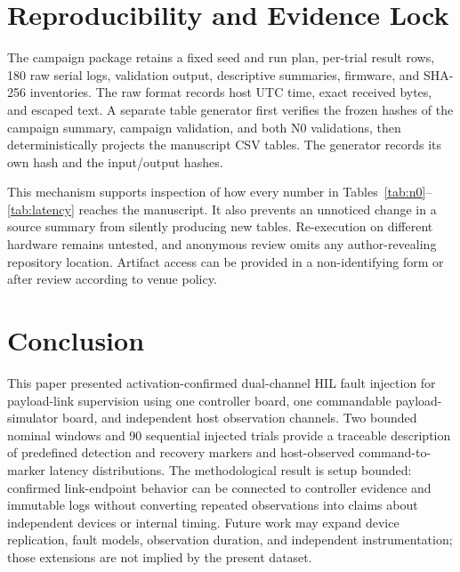 \documentclass[conference]{IEEEtran}
\begin{document}
\section{Reproducibility and Evidence Lock}

The campaign package retains a fixed seed and run plan, per-trial result rows, 180 raw serial logs, validation output, descriptive summaries, firmware, and SHA-256 inventories. The raw format records host UTC time, exact received bytes, and escaped text. A separate table generator first verifies the frozen hashes of the campaign summary, campaign validation, and both N0 validations, then deterministically projects the manuscript CSV tables. The generator records its own hash and the input/output hashes.

This mechanism supports inspection of how every number in Tables~\ref{tab:n0}--\ref{tab:latency} reaches the manuscript. It also prevents an unnoticed change in a source summary from silently producing new tables. Re-execution on different hardware remains untested, and anonymous review omits any author-revealing repository location. Artifact access can be provided in a non-identifying form or after review according to venue policy.

\section{Conclusion}

This paper presented activation-confirmed dual-channel HIL fault injection for payload-link supervision using one controller board, one commandable payload-simulator board, and independent host observation channels. Two bounded nominal windows and 90 sequential injected trials provide a traceable description of predefined detection and recovery markers and host-observed command-to-marker latency distributions. The methodological result is setup bounded: confirmed link-endpoint behavior can be connected to controller evidence and immutable logs without converting repeated observations into claims about independent devices or internal timing. Future work may expand device replication, fault models, observation duration, and independent instrumentation; those extensions are not implied by the present dataset.

\balance


\end{document}
